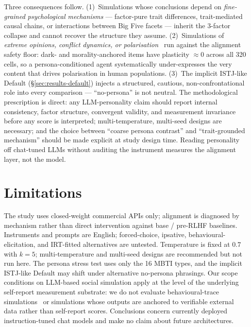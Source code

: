 \documentclass[11pt]{article}
\begin{document}
Three consequences follow. (1)~Simulations whose conclusions depend on \emph{fine-grained psychological mechanisms} --- factor-pure trait differences, trait-mediated causal chains, or interactions between Big Five facets --- inherit the 3-factor collapse and cannot recover the structure they assume. (2)~Simulations of \emph{extreme opinions, conflict dynamics, or polarisation}~\citep{chuang2025debate,cau2025language} run against the alignment safety floor: dark- and morality-anchored items have plasticity ${\approx}0$ across all 320 cells, so a persona-conditioned agent systematically under-expresses the very content that drives polarisation in human populations. (3)~The implicit ISTJ-like Default (\S\ref{sec:results-default}) injects a structured, cautious, non-confrontational role into every comparison --- ``no-persona'' is not neutral. The methodological prescription is direct: any LLM-personality claim should report internal consistency, factor structure, convergent validity, and measurement invariance before any score is interpreted; multi-temperature, multi-seed designs are necessary; and the choice between ``coarse persona contrast'' and ``trait-grounded mechanism'' should be made explicit at study design time. Reading personality off chat-tuned LLMs without auditing the instrument measures the alignment layer, not the model.


\section*{Limitations}
\label{sec:limitations}

The study uses closed-weight commercial APIs only; alignment is diagnosed by mechanism rather than direct intervention against base / pre-RLHF baselines. Instruments and prompts are English; forced-choice, ipsative, behavioural-elicitation, and IRT-fitted alternatives are untested. Temperature is fixed at $0.7$ with $k{=}5$; multi-temperature and multi-seed designs are recommended but not run here. The persona stress test uses only the 16 MBTI types, and the implicit ISTJ-like Default may shift under alternative no-persona phrasings. Our scope conditions on LLM-based social simulation apply at the level of the underlying self-report measurement substrate: we do not evaluate behavioural-trace simulations~\citep{park2023generative} or simulations whose outputs are anchored to verifiable external data rather than self-report scores. Conclusions concern currently deployed instruction-tuned chat models and make no claim about future architectures.
\end{document}
